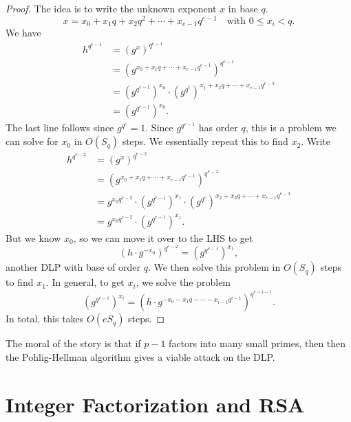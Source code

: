 \documentclass[12pt]{article}
\theoremstyle{plain}
\theoremstyle{definition}
\theoremstyle{remark}
\begin{document}
\begin{proof}
    The idea is to write the unknown exponent $x$ in base $q$.
    \[
        x = x_0 + x_1q + x_2q^2 + \cdots + x_{e-1}q^{e-1}\quad\text{with }0\leq x_i<q.
    \]
    We have
    \begin{align*}
        h^{q^{e-1}} &= (g^x)^{q^{e-1}}\\
        &= \left(g^{x_0 + x_1q + \cdots + x_{e-1}q^{e-1}}\right)^{q^{e-1}}\\
        &= (g^{q^{e-1}})^{x_0}\cdot \left(g^{q^e}\right)^{x_1 + x_2q + \cdots + x_{e-1}q^{e-2}}\\
        &= \left(g^{q^{e-1}}\right)^{x_0}.
    \end{align*}
    The last line follows since $g^{q^{e}} = 1$.
    Since $g^{q^{e-1}}$ has order $q$, this is a problem we can solve for $x_0$ in $O(S_q)$ steps.
    We essentially repeat this to find $x_2$.
    Write
    \begin{align*}
        h^{q^{e-2}} &= (g^x)^{q^{e-2}}\\
        &= \left(g^{x_0 + x_1q + \cdots + x_{e-1}q^{e-1}}\right)^{q^{e-2}}\\
        &= g^{x_0q^{e-2}}\cdot \left(g^{q^{e-1}}\right)^{x_1}\cdot  \left(g^{q^e}\right)^{x_2 + x_3q + \cdots + x_{e-1}q^{e-3}}\\
        &= g^{x_0q^{e-2}}\cdot \left(g^{q^{e-1}}\right)^{x_1}.
    \end{align*}
    But we know $x_0$, so we can move it over to the LHS to get
    \[
        (h\cdot g^{-x_0})^{q^{e-2}} = (g^{q^{e-1}})^{x_1},
    \]
    another DLP with base of order $q$.
    We then solve this problem in $O(S_q)$ steps to find $x_1$.
    In general, to get $x_i$, we solve the problem
    \[
        (g^{q^{e-1}})^{x_i} = \left(h\cdot g^{-x_0 - x_1q - \cdots - x_{i-1}q^{i-1}}\right)^{q^{e-i-1}}.
    \]
    In total, this takes $O(eS_q)$ steps.
\end{proof}

The moral of the story is that if $p-1$ factors into many small primes, then then the Pohlig-Hellman algorithm gives a viable attack on the DLP.










\section{Integer Factorization and RSA}
\end{document}
